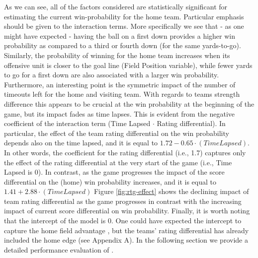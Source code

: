 \documentclass{sig-alternate}
\begin{document}
As we can see, all of the factors considered are statistically significant for estimating the current win-probability for the home team. 
Particular emphasis should be given to the interaction terms. 
More specifically we see that - as one might have expected - having the ball on a first down provides a higher win probability as compared to a third or fourth down (for the same yards-to-go).  
Similarly, the probability of winning for the home team increases when its offensive unit is closer to the goal line (Field Position variable), while fewer yards to go for a first down are also associated with a larger win probability. 
Furthermore, an interesting point is the symmetric impact of the number of timeouts left for the home and visiting team.  
With regards to teams strength difference this appears to be crucial at the win probability at the beginning of the game, but its impact fades as time lapses. 
This is evident from the negative coefficient of the interaction term (Time Lapsed $\cdot$ Rating differential). 
In particular, the effect of the team rating differential on the win probability depends also on the time lapsed, and it is equal to $1.72-0.65\cdot(Time Lapsed)$. 
In other words, the coefficient for the rating differential (i.e., 1.7) captures only the effect of the rating differential at the very start of the game (i.e., Time Lapsed is 0). 
In contrast, as the game progresses the impact of the score differential on the (home) win probability increases, and it is equal to $1.41+2.88\cdot(Time Lapsed)$
Figure \ref{fig:rtg-effect} shows the declining impact of team rating differential as the game progresses in contrast with the increasing impact of current score differential  on win probability. 
Finally, it is worth noting that the intercept of the model is 0. 
One could have expected the intercept to capture the home field advantage \cite{kpele-plosone}, but the teams' rating differential has already included the home edge (see Appendix A).   
In the following section we provide a detailed performance evaluation of {\method}.
\end{document}
